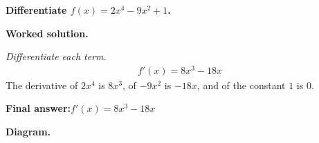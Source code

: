 \documentclass[11pt]{article}
\newcommand{\question}[1]{\par\medskip\noindent\textbf{#1}\par}
\begin{document}
\question{Differentiate \( f(x) = 2x^4 - 9x^2 + 1 \).}

\textbf{Worked solution.}

\textit{Differentiate each term.}
\[\begin{gathered}
f'(x) = 8x^3 - 18x
\end{gathered}\]
The derivative of \(2x^4\) is \(8x^3\), of \(-9x^2\) is \(-18x\), and of the constant \(1\) is \(0\).

\begin{answerbox}
\textbf{Final answer:}\quad \(\displaystyle  f'(x) = 8x^3 - 18x \)
\end{answerbox}
\textbf{Diagram.}

\begin{center}
\end{center}
\end{document}
